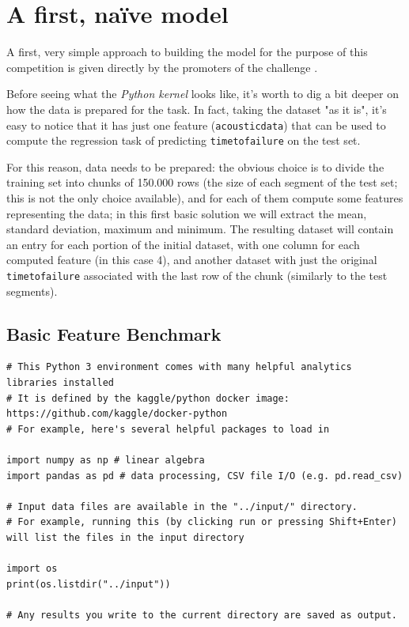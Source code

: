 \chapter{A first, na{\"i}ve model}
\label{capitolo2}
\thispagestyle{empty}

\noindent A first, very simple approach to building the model for the purpose of this competition is given directly by the promoters of the challenge \cite{kernelinit}.

\bigbreak

Before seeing what the \textit{Python kernel} looks like, it's worth to dig a bit deeper on how the data is prepared for the task. In fact, taking the dataset "as it is", it's easy to notice that it has just one feature (\texttt{acoustic\textunderscore data}) that can be used to compute the regression task of predicting \texttt{time\textunderscore to\textunderscore failure} on the test set.

For this reason, data needs to be prepared: the obvious choice is to divide the training set into chunks of 150.000 rows (the size of each segment of the test set; this is not the only choice available), and for each of them compute some features representing the data; in this first basic solution we will extract the mean, standard deviation, maximum and minimum. The resulting dataset will contain an entry for each portion of the initial dataset, with one column for each computed feature (in this case 4), and another dataset with just the original \texttt{time\textunderscore to\textunderscore failure} associated with the last row of the chunk (similarly to the test segments).

\section{Basic Feature Benchmark}
\begin{lstlisting}
# This Python 3 environment comes with many helpful analytics libraries installed
# It is defined by the kaggle/python docker image: https://github.com/kaggle/docker-python
# For example, here's several helpful packages to load in 

import numpy as np # linear algebra
import pandas as pd # data processing, CSV file I/O (e.g. pd.read_csv)

# Input data files are available in the "../input/" directory.
# For example, running this (by clicking run or pressing Shift+Enter) will list the files in the input directory

import os
print(os.listdir("../input"))

# Any results you write to the current directory are saved as output.
\end{lstlisting}

